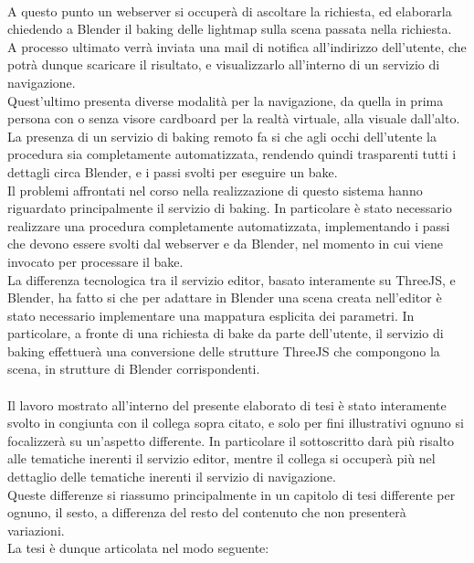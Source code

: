 \\
A questo punto un webserver si occuperà di ascoltare la richiesta, ed elaborarla chiedendo a Blender il baking delle lightmap sulla scena passata nella richiesta. 
\\
A processo ultimato verrà inviata una mail di notifica all’indirizzo dell’utente, che potrà dunque scaricare il risultato, e visualizzarlo all’interno di un servizio di navigazione. 
\\
Quest’ultimo presenta diverse modalità per la navigazione, da quella in prima persona con o senza visore cardboard per la realtà virtuale, alla visuale dall’alto.
\\
La presenza di un servizio di baking remoto fa si che agli occhi dell’utente la procedura sia completamente automatizzata, rendendo quindi trasparenti tutti i dettagli circa Blender, e i passi svolti per eseguire un bake.
\\
Il problemi affrontati nel corso nella realizzazione di questo sistema hanno riguardato principalmente il servizio di baking. In particolare è stato necessario realizzare una procedura completamente automatizzata, implementando i passi che devono essere svolti dal webserver e da Blender, nel momento in cui viene invocato per processare il bake.
\\
La differenza tecnologica tra il servizio editor, basato interamente su ThreeJS, e Blender, ha fatto si che per adattare in Blender una scena creata nell’editor è stato necessario implementare una mappatura esplicita dei parametri. In particolare, a fronte di una richiesta di bake da parte dell’utente, il servizio di baking effettuerà una conversione delle strutture ThreeJS che compongono la scena, in strutture di Blender corrispondenti. 
\\
\\
Il lavoro mostrato all’interno del presente elaborato di tesi è stato interamente svolto in congiunta con il collega sopra citato, e solo per fini illustrativi ognuno si focalizzerà su un’aspetto differente. In particolare il sottoscritto darà più risalto alle tematiche inerenti il servizio editor, mentre il collega si occuperà più nel dettaglio delle tematiche inerenti il servizio di navigazione. 
\\
Queste differenze si riassumo principalmente in un capitolo di tesi differente per ognuno, il sesto, a differenza del resto del contenuto che non presenterà variazioni. 
\\
La tesi è dunque articolata nel modo seguente:

